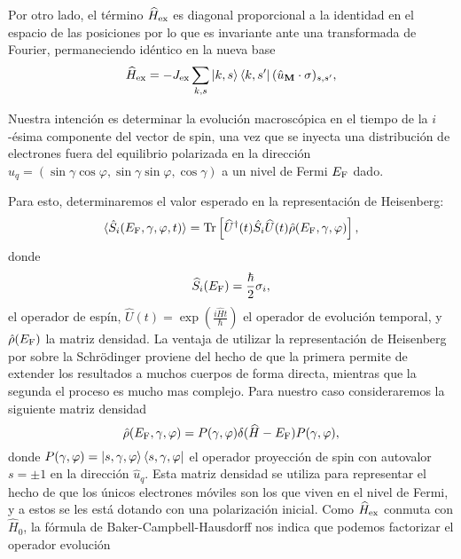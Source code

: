 Por otro lado, el término $\widehat{H}_{\rm ex}$ es diagonal proporcional a la identidad en el espacio de las posiciones por lo que es invariante ante una transformada de Fourier, permaneciendo idéntico en la nueva base
\begin{align*}
	\widehat{H}_{\rm ex}  = -J_{\rm ex } \sum_{k, s} \ket{k,s}\bra{k, s'} (\hat{u}_{\textbf{M}}\cdot \vb{\sigma})_{s,s'} ,
\end{align*}

Nuestra intención es determinar la 
evolución macroscópica en el tiempo de la $i$-ésima componente del vector de spin, una vez que se inyecta una distribución de electrones fuera del equilibrio polarizada en la dirección $\hat{u}_{q}=(\sin\gamma\cos\varphi,\sin\gamma\sin\varphi,\cos\gamma)$ a un nivel de Fermi $E_{\rm F}$ dado. 

Para esto, determinaremos el valor esperado en la representación de Heisenberg:
\begin{equation}
	\langle \hat{S}_i(E_{\rm{F}},\gamma,\varphi,t) \rangle = \operatorname{Tr}\left[\widehat{U}^\dagger(t)\hat{S}_i \widehat{U}(t)  \hat{\rho}(E_{\rm{F}},\gamma,\varphi) \right],
\end{equation}
donde 
\begin{equation}\label{eq:spinOP}
	\widehat{S}_i(E_{\rm F}) = \frac{\hbar}{2}\sigma_i,
\end{equation}
el operador de espín,  $\widehat{U}(t) = \exp(\frac{i\widehat{H}t}{\hbar}) $ el operador de evolución temporal, y $ \hat{\rho}(E_{\rm{F}})$ la matriz densidad.  La ventaja de utilizar la representación de Heisenberg por sobre la Schrödinger proviene del hecho de que la primera permite de extender los resultados a muchos cuerpos de forma directa, mientras que la segunda el proceso es mucho mas complejo. Para nuestro caso consideraremos la siguiente matriz densidad
\begin{equation}
	\hat{\rho}{(E_{\rm{F}},\gamma,\varphi) = P(\gamma,\varphi)\delta(\widehat{H}- E_{\rm F} )P(\gamma,\varphi)},
\end{equation}
donde $P(\gamma,\varphi)=\ket{s,\gamma,\varphi} \bra{s,\gamma,\varphi}$ el operador proyección de spin con autovalor $s=\pm 1$ en la dirección $\hat{u}_{q}$. Esta matriz densidad   se utiliza para representar el hecho de que los únicos electrones móviles son los que viven en el nivel de Fermi, y a estos se les está dotando con una polarización inicial.  Como $\widehat{H}_{\rm ex}$ conmuta con $\widehat{H}_{0}$, la fórmula  de Baker-Campbell-Hausdorff nos indica que podemos factorizar el operador evolución
